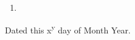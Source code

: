 \begin{enumerate}[leftmargin=*]
	
	
	
	
	
	\item

		
		
		
		



		
\end{enumerate}

\vspace{1cm}

	
		\noindent
		Dated this x\textsuperscript{y} day of Month Year.
	




